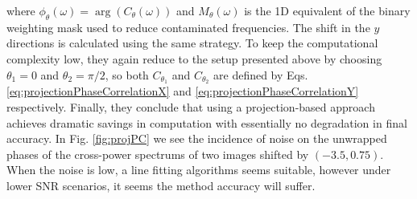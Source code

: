 where $\phi_\theta(\omega) = \arg\left( C_\theta(\omega)\right)$ and $M_\theta(\omega)$ is the 1D equivalent of the binary weighting mask used to reduce contaminated frequencies. The shift in the $y$ directions is calculated using the same strategy. To keep the computational complexity low, they again reduce to the setup presented above by choosing $\theta_1=0$ and $\theta_2=\pi/2$, so both $C_{\theta_1}$ and $C_{\theta_2}$ are defined by Eqs. \eqref{eq:projectionPhaseCorrelationX} and \eqref{eq:projectionPhaseCorrelationY} respectively. Finally, they conclude that using a projection-based approach achieves dramatic savings in computation with essentially no degradation in final accuracy. In Fig. \ref{fig:projPC} we see the incidence of noise on the unwrapped phases of the cross-power spectrums of two images shifted by $(-3.5,0.75)$. When the noise is low, a line fitting algorithms seems suitable, however under lower SNR scenarios, it seems the method accuracy will suffer.

